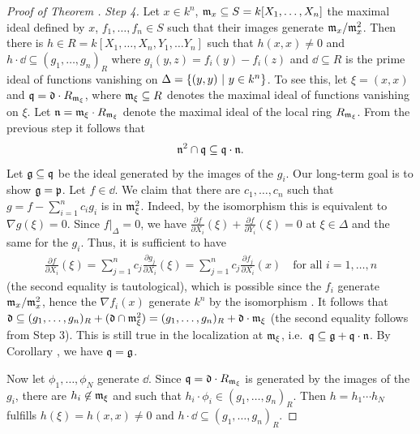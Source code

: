 \documentclass[a4paper,parskip=half,numbers=enddot, DIV=12]{scrreprt}
\begin{document}
\begin{proof}[Proof of Theorem ]
    \emph{Step 4.} Let $x\in k^n$, $\mathfrak{m}_x \subseteq S= k[X_1,\ldots, X_n]$ the maximal ideal defined by $x$, $f_1,\ldots, f_n\in S$ such that their images generate $\mathfrak{m}_x/\mathfrak{m}_x^2$. Then there is $h\in R = k[X_1,\ldots, X_n,Y_1,\ldots Y_n]$ such that $h(x,x) \neq 0$ and $h\cdot \dd \subseteq (g_1,\ldots, g_n)_R$ where $g_i(y,z) = f_i(y)-f_i(z)$ and $\dd\subseteq R$ is the prime ideal of functions vanishing on $\Delta = \left\{(y,y)\ \middle|\  y\in k^n\right\}$. To see this, let $\xi = (x,x)$ and $\mathfrak{q} = \mathfrak{d} \cdot R_{\mathfrak{m}_\xi}$, where $\mathfrak{m}_\xi\subseteq R$ denotes the maximal ideal of functions vanishing on $\xi$. Let $\mathfrak{n} = \mathfrak{m}_\xi\cdot R_{\mathfrak{m}_\xi}$ denote the maximal ideal of the local ring $R_{\mathfrak{m}_\xi}$. From the previous step it follows that 
    \begin{align}\lbl{eq:thm15}
        \nn^2\cap \qq\subseteq \qq\cdot \nn .
    \end{align}
    Let $\mathfrak{g}\subseteq \mathfrak{q}$ be the ideal generated by the images of the $g_i$. Our long-term goal is to show $\mathfrak{g}=\mathfrak{p}$. Let $f\in \dd$. We claim that there are $c_1,\ldots,c_n$ such that $g=f-\sum_{i=1}^n c_i g_i$ is in $\mathfrak{m}_\xi^2$. Indeed, by the isomorphism  this is equivalent to $\nabla g(\xi)=0$. Since $f|_\Delta = 0$, we have $\frac{\partial f}{\partial X_i}(\xi) + \frac{\partial f}{\partial Y_i}(\xi) = 0$ at $\xi\in \Delta$ and the same for the $g_i$. Thus, it is sufficient to have 
    \begin{align*}
        \frac{\partial f}{\partial X_i}(\xi) = \sum_{j=1}^n c_j \frac{\partial g_j}{\partial X_i}(\xi) = \sum_{j=1}^n c_j \frac{\partial f_j}{\partial X_i}(x)\quad\text{for all }i=1,\ldots,n
    \end{align*}
    (the second equality is tautological), which is possible since the $f_i$ generate $\mathfrak{m}_x/\mathfrak{m}_x^2$, hence the $\nabla f_i(x)$ generate $k^n$ by the isomorphism . It follows that $\mathfrak{d}\subseteq (g_1,\ldots,g_n)_R + (\mathfrak{d}\cap \mathfrak{m}_\xi^2) = (g_1,\ldots,g_n)_R + \mathfrak{d}\cdot \mathfrak{m}_\xi$ (the second equality follows from Step 3). This is still true in the localization at $\mathfrak{m}_\xi$, i.e.\ $\mathfrak{q}\subseteq \mathfrak{g} +\mathfrak{q}\cdot\mathfrak{n}$. By Corollary , we have $\mathfrak{q}= \mathfrak{g}$. 
    
    Now let $\phi_1,\ldots,\phi_N$ generate $\dd$. Since $\mathfrak{q} =\mathfrak{d}\cdot R_{\mathfrak{m}_\xi}$ is generated by the images of the $g_i$, there are $h_i\not\in \mathfrak{m}_\xi$ and such that $h_i\cdot \phi_i \in(g_1,\ldots,g_n)_R$. Then $h=h_1\cdots h_N$ fulfills $h(\xi)=h(x,x)\not=0$ and $h\cdot\dd\subseteq(g_1,\ldots,g_n)_R$.
    

\end{proof}
\end{document}
